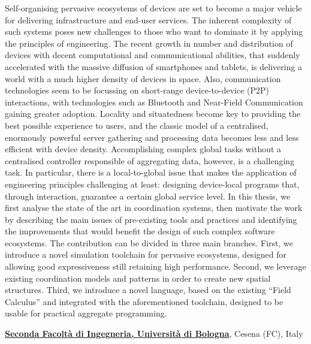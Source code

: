 \documentclass[10pt]{article}
\newenvironment{outerlist}[1][\enskip\textbullet]%
        {\begin{itemize}[#1]}{\end{itemize}%
         \vspace{-.6\baselineskip}}
\newcommand{\halfblankline}{\quad\vspace{-0.5\baselineskip}\pagebreak[3]}
\begin{document}
\begin{outerlist}
Self-organising pervasive ecosystems of devices are set to become a major vehicle for delivering infrastructure and end-user services. The inherent complexity of such systems poses new challenges to those who want to dominate it by applying the principles of engineering. The recent growth in number and distribution of devices with decent computational and communicational abilities, that suddenly accelerated with the massive diffusion of smartphones and tablets, is delivering a world with a much higher density of devices in space. Also, communication technologies seem to be focussing on short-range device-to-device (P2P) interactions, with technologies such as Bluetooth and Near-Field Communication gaining greater adoption. Locality and situatedness become key to providing the best possible experience to users, and the classic model of a centralised, enormously powerful server gathering and processing data becomes less and less efficient with device density. Accomplishing complex global tasks without a centralised controller responsible of aggregating data, however, is a challenging task. In particular, there is a local-to-global issue that makes the application of engineering principles challenging at least: designing device-local programs that, through interaction, guarantee a certain global service level. In this thesis, we first analyse the state of the art in coordination systems, then motivate the work by describing the main issues of pre-existing tools and practices and identifying the improvements that would benefit the design of such complex software ecosystems.
The contribution can be divided in three main branches. First, we introduce a novel simulation toolchain for pervasive ecosystems, designed for allowing good expressiveness still retaining high performance. Second, we leverage existing coordination models and patterns in order to create new spatial structures. Third, we introduce a novel language, based on the existing ``Field Calculus'' and integrated with the aforementioned toolchain, designed to be usable for practical aggregate programming.

\halfblankline{}
\end{outerlist}
\href{http://www.ing2.unibo.it/Ingegneria+Cesena/default.htm}{\textbf{Seconda Facoltà di Ingegneria, Università di Bologna}}, Cesena (FC), Italy
\end{document}
